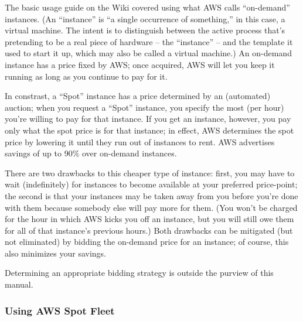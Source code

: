 The basic usage guide on the Wiki covered using what AWS calls ``on-demand''
instances.  (An ``instance'' is ``a single occurrence of something,'' in
this case, a virtual machine.  The intent is to distinguish between the
active process that's pretending to be a real piece of hardware --
the ``instance'' -- and the template it used to start it up, which may also
be called a virtual machine.)  An on-demand instance has a price fixed by AWS;
once acquired, AWS will let you keep it running as long as you continue to
pay for it.

In constrast, a ``Spot'' instance has a price determined by an (automated)
auction; when you request a ``Spot'' instance, you specify the most (per hour)
you're willing to pay for that instance.  If you get an instance, however,
you pay only what the spot price is for that instance; in effect, AWS
determines the spot price by lowering it until they run out of instances
to rent.  AWS advertises savings of up to 90\% over on-demand instances.

There are two drawbacks to this cheaper type of instance: first,
you may have to wait (indefinitely) for instances to become available at
your preferred price-point; the second is that your instances may be taken
away from you before you're done with them because somebody else will pay
more for them.  (You won't be charged for the hour in which AWS kicks
you off an instance, but you will still owe them for all of that instance's
previous hours.)  Both drawbacks can be mitigated (but not eliminated) by
bidding the on-demand price for an instance; of course, this also minimizes
your savings.

Determining an appropriate bidding strategy is outside the purview of
this manual.

\subsubsection{Using AWS Spot Fleet}

